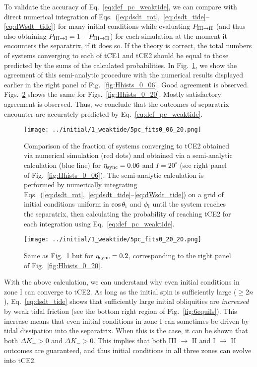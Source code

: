 \documentclass[
        fleqn,
        usenatbib,
    ]{mnras}
\begin{document}
To validate the accuracy of Eq.~\eqref{eq:def_pc_weaktide}, we can compare with
direct numerical integration of
Eqs.~(\ref{eq:dsdt_rot},~\ref{eq:dsdt_tide}--\ref{eq:dWsdt_tide}) for many
initial conditions while evaluating $P_{\rm III \to II}$ (and thus also
obtaining $P_{\rm III \to I} = 1 - P_{\rm III \to II}$) for each simulation at
the moment it encounters the separatrix, if it does so. If the theory is
correct, the total numbers of systems converging to each of tCE1 and tCE2 should
be equal to those predicted by the sums of the calculated probabilities. In
Fig.~\ref{fig:pc_fits_0_06}, we show the agreement of this semi-analytic
procedure with the numerical results displayed earlier in the right panel of
Fig.~\ref{fig:Hhists_0_06}. Good agreement is observed.
Figs.~\ref{fig:pc_fits_0_20} shows the same for Figs.~\ref{fig:Hhists_0_20}.
Mostly satisfactory agreement is observed. Thus, we conclude that the outcomes
of separatrix encounter are accurately predicted by
Eq.~\eqref{eq:def_pc_weaktide}.
\begin{figure}
    \centering
    \texttt{[image: ../initial/1\_weaktide/5pc\_fits0\_06\_20.png]}
    \caption{Comparison of the fraction of systems converging to tCE2 obtained
    via numerical simulation (red dots) and obtained via a semi-analytic
    calculation (blue line) for $\eta_{\rm sync} = 0.06$ and $I = 20^\circ$ (see
    right panel of Fig.~\ref{fig:Hhists_0_06}). The semi-analytic calculation is
    performed by numerically integrating
    Eqs.~(\ref{eq:dsdt_rot},~\ref{eq:dsdt_tide}--\ref{eq:dWsdt_tide}) on a grid
    of initial conditions uniform in $\cos \theta_{\rm i}$ and $\phi_{\rm i}$
    until the system reaches the separatrix, then calculating the probability of
    reaching tCE2 for each integration using
    Eq.~\eqref{eq:def_pc_weaktide}.}\label{fig:pc_fits_0_06}
\end{figure}
\begin{figure}
    \centering
    \texttt{[image: ../initial/1\_weaktide/5pc\_fits0\_20\_20.png]}
    \caption{Same as Fig.~\ref{fig:pc_fits_0_06} but for $\eta_{\rm sync} =
    0.2$, corresponding to the right panel of
    Fig.~\ref{fig:Hhists_0_20}.}\label{fig:pc_fits_0_20}
\end{figure}

With the above calculation, we can understand why even initial conditions in
zone I can converge to tCE2. As long as the initial spin is sufficiently large
($\geq 2n$), Eq.~\eqref{eq:dsdt_tide} shows that sufficiently large initial
obliquities are \emph{increased} by weak tidal friction (see the bottom right
region of Fig.~\ref{fig:6equils}). This increase means that even initial
conditions in zone I can sometimes be driven by tidal dissipation into the
separatrix. When this is the case, it can be shown that both $\Delta K_+ > 0$
and $\Delta K_- > 0$. This implies that both III $\to$ II and I $\to$ II
outcomes are guaranteed, and thus initial conditions in all three zones can
evolve into tCE2.
\end{document}
